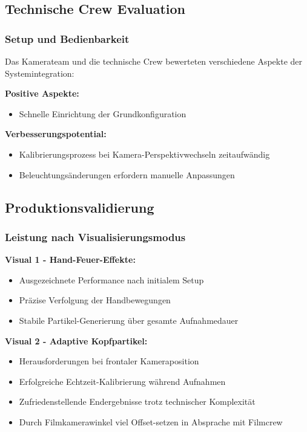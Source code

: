 \subsection{Technische Crew Evaluation}

\subsubsection{Setup und Bedienbarkeit}
Das Kamerateam und die technische Crew bewerteten verschiedene Aspekte der Systemintegration:

\textbf{Positive Aspekte:}
\begin{itemize}
    \item Schnelle Einrichtung der Grundkonfiguration
\end{itemize}

\textbf{Verbesserungspotential:}
\begin{itemize}
    \item Kalibrierungsprozess bei Kamera-Perspektivwechseln zeitaufwändig
    \item Beleuchtungsänderungen erfordern manuelle Anpassungen
\end{itemize}

\subsection{Produktionsvalidierung}

\subsubsection{Leistung nach Visualisierungsmodus}

\textbf{Visual 1 - Hand-Feuer-Effekte:}
\begin{itemize}
    \item Ausgezeichnete Performance nach initialem Setup
    \item Präzise Verfolgung der Handbewegungen
    \item Stabile Partikel-Generierung über gesamte Aufnahmedauer
\end{itemize}

\textbf{Visual 2 - Adaptive Kopfpartikel:}
\begin{itemize}
    \item Herausforderungen bei frontaler Kameraposition
    \item Erfolgreiche Echtzeit-Kalibrierung während Aufnahmen
    \item Zufriedenstellende Endergebnisse trotz technischer Komplexität
    \item Durch Filmkamerawinkel viel Offset-setzen in Absprache mit Filmcrew
\end{itemize}

